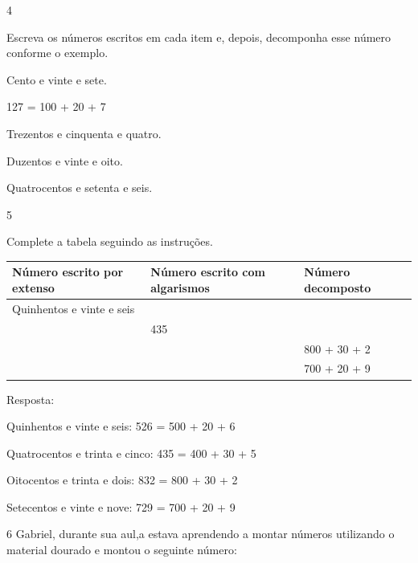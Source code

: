 \num{4}

Escreva os números escritos em cada item e, depois, decomponha esse
número conforme o exemplo.

\item Cento e vinte e sete.

127 = 100 + 20 + 7

\begin{escolha}

\item Trezentos e cinquenta e quatro.


\item Duzentos e vinte e oito.


\item
  Quatrocentos e setenta e seis.


\end{escolha}

\num{5}

Complete a tabela seguindo as instruções.

\begin{longtable}[]{@{}lll@{}}
\toprule
Número escrito por extenso & Número escrito com algarismos & Número
decomposto\tabularnewline
\midrule
\endhead
Quinhentos e vinte e seis & &\tabularnewline
& 435 &\tabularnewline
& & 800 + 30 + 2\tabularnewline
& & 700 + 20 + 9\tabularnewline
\bottomrule
\end{longtable}

Resposta:

Quinhentos e vinte e seis: 526 = 500 + 20 + 6

Quatrocentos e trinta e cinco: 435 = 400 + 30 + 5

Oitocentos e trinta e dois: 832 = 800 + 30 + 2

Setecentos e vinte e nove: 729 = 700 + 20 + 9

\num{6} Gabriel, durante sua aul,a estava aprendendo a montar números utilizando o
material dourado e montou o seguinte número:



